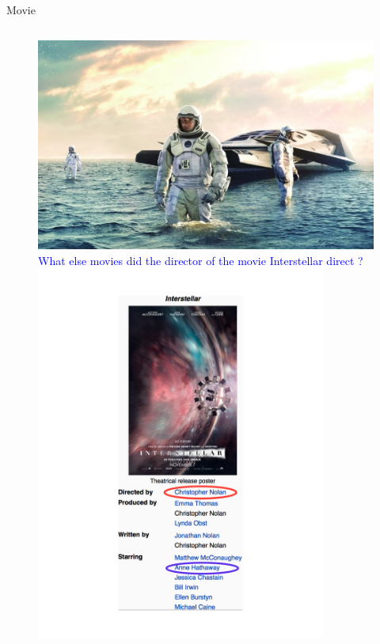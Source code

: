 \documentclass{beamer}
\begin{document}
\begin{frame}{Movie}
	\begin{figure}
	\begin{columns}[c]
			\centering\includegraphics[width=1.0\textwidth]{introduction/interstellar.jpg}\\
			\textcolor{blue}{What else movies did the director of the movie Interstellar direct ?} \\
			\centering\includegraphics[width=0.85\textwidth]{introduction/interstellar_info_tagged.pdf}
		\end{columns}
	\end{figure}
\end{frame}
\end{document}
